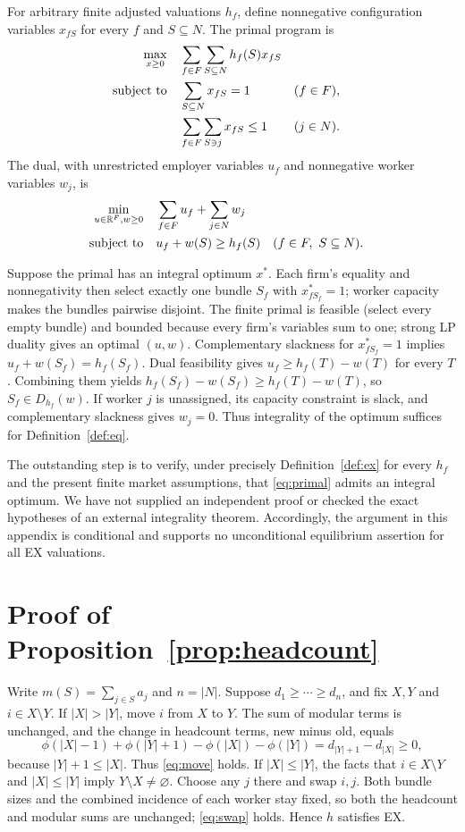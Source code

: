 \documentclass[11pt]{article}
\theoremstyle{definition}
\theoremstyle{remark}
\numberwithin{equation}{section}
\begin{document}
For arbitrary finite adjusted valuations $h_f$, define nonnegative configuration variables $x_{fS}$ for every $f$ and $S\subseteq N$. The primal program is
\begin{align}
\max_{x\ge0}\quad&\sum_{f\in F}\sum_{S\subseteq N}h_f(S)x_{fS} \label{eq:primal}\\
\text{subject to}\quad&
 \sum_{S\subseteq N}x_{fS}=1 &&(f\in F),\notag\\
&\sum_{f\in F}\sum_{S\ni j}x_{fS}\le1 &&(j\in N).\notag
\end{align}
The dual, with unrestricted employer variables $u_f$ and nonnegative worker variables $w_j$, is
\begin{align}
\min_{u\in\mathbb R^F,w\ge0}\quad&
\sum_{f\in F}u_f+\sum_{j\in N}w_j \label{eq:dual}\\
\text{subject to}\quad&
u_f+w(S)\ge h_f(S) &&(f\in F,\ S\subseteq N).\notag
\end{align}

Suppose the primal has an integral optimum $x^*$. Each firm's equality and nonnegativity then select exactly one bundle $S_f$ with $x^*_{fS_f}=1$; worker capacity makes the bundles pairwise disjoint. The finite primal is feasible (select every empty bundle) and bounded because every firm's variables sum to one; strong LP duality gives an optimal $(u,w)$. Complementary slackness for $x^*_{fS_f}=1$ implies $u_f+w(S_f)=h_f(S_f)$. Dual feasibility gives $u_f\ge h_f(T)-w(T)$ for every $T$. Combining them yields $h_f(S_f)-w(S_f)\ge h_f(T)-w(T)$, so $S_f\in D_{h_f}(w)$. If worker $j$ is unassigned, its capacity constraint is slack, and complementary slackness gives $w_j=0$. Thus integrality of the optimum suffices for Definition~\ref{def:eq}.

The outstanding step is to verify, under precisely Definition~\ref{def:ex} for every $h_f$ and the present finite market assumptions, that \eqref{eq:primal} admits an integral optimum. We have not supplied an independent proof or checked the exact hypotheses of an external integrality theorem. Accordingly, the argument in this appendix is conditional and supports no unconditional equilibrium assertion for all EX valuations.

\section{Proof of Proposition~\ref{prop:headcount}}\label{app:headcount}

Write $m(S)=\sum_{j\in S}a_j$ and $n=|N|$. Suppose $d_1\ge\cdots\ge d_n$, and fix $X,Y$ and $i\in X\setminus Y$. If $|X|>|Y|$, move $i$ from $X$ to $Y$. The sum of modular terms is unchanged, and the change in headcount terms, new minus old, equals
\[
\phi(|X|-1)+\phi(|Y|+1)-\phi(|X|)-\phi(|Y|)
=d_{|Y|+1}-d_{|X|}\ge0,
\]
because $|Y|+1\le|X|$. Thus \eqref{eq:move} holds. If $|X|\le|Y|$, the facts that $i\in X\setminus Y$ and $|X|\le|Y|$ imply $Y\setminus X\ne\varnothing$. Choose any $j$ there and swap $i,j$. Both bundle sizes and the combined incidence of each worker stay fixed, so both the headcount and modular sums are unchanged; \eqref{eq:swap} holds. Hence $h$ satisfies EX.
\end{document}
